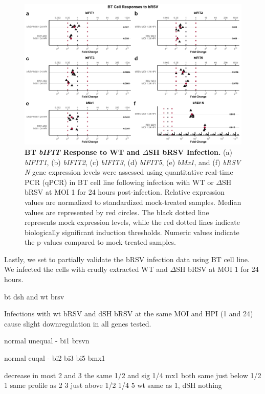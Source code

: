 \begin{figure}
    \centering
    \includegraphics[width=1\linewidth]{07. Chapter 2/Figs/02. Induction/09. bt_brsv.pdf}
    \caption[BT \textit{bIFIT} Response to WT and \(\Delta\)SH bRSV Infection.]{\textbf{BT \textit{bIFIT} Response to WT and \(\Delta\)SH bRSV Infection.} (a) \textit{bIFIT1}, (b) \textit{bIFIT2}, (c) \textit{bIFIT3}, (d) \textit{bIFIT5}, (e) \textit{bMx1}, and (f) \textit{bRSV N} gene expression levels were assessed using quantitative real-time PCR (qPCR) in BT cell line following infection with WT or \(\Delta\)SH bRSV at MOI 1 for 24 hours post-infection. Relative expression values are normalized to standardized mock-treated samples. Median values are represented by red circles. The black dotted line represents mock expression levels, while the red dotted lines indicate biologically significant induction thresholds. Numeric values indicate the p-values compared to mock-treated samples.}
    \label{fig:BT responses to bRSV}
\end{figure}

Lastly, we set to partially validate the bRSV infection data using BT cell line. We infected the cells with crudly extracted WT and \(\Delta\)SH bRSV at MOI 1 for 24 hours. 

bt dsh and wt brsv
    
Infections with wt bRSV and dSH bRSV at the same MOI and HPI (1 and 24) cause slight downregulation in all genes tested.
    
normal unequal - bi1 brsvn
    
normal euqal - bi2 bi3 bi5 bmx1
    
decrease in most
2 and 3 the same
1/2 and sig 1/4
mx1 both same just below 1/2
1 same profile as 2 3 
    just above 1/2 1/4
5 wt same as 1, dSH nothing    

